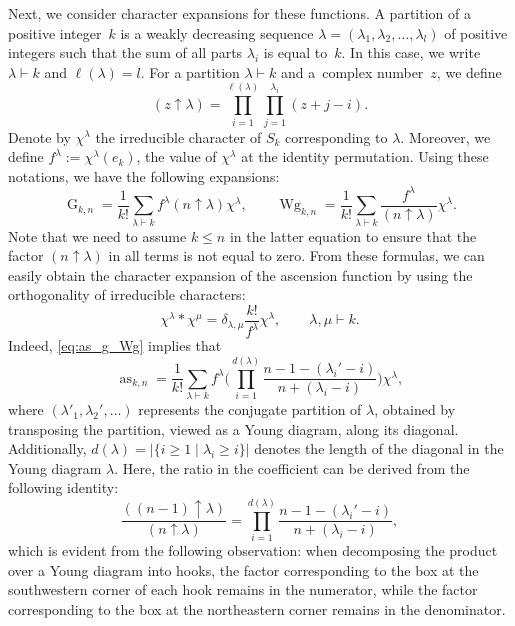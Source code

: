 \documentclass[10pt,a4paper]{amsart}
\numberwithin{equation}{section}
\theoremstyle{definition}
\DeclareMathOperator{\Raise}{as}
\DeclareMathOperator{\G}{G}
\DeclareMathOperator{\Wg}{Wg}
\begin{document}
Next, we consider character expansions for these functions.
A partition of a positive integer~$k$ is a weakly decreasing sequence
$\lambda=(\lambda_1,\lambda_2,\dots,\lambda_l)$ of positive integers
such that the sum of all parts $\lambda_i$ is equal to~$k$.
In this case, we write $\lambda \vdash k$
and $\ell(\lambda)=l$.
For a partition $\lambda \vdash k$ and a~complex number~$z$, we define
\[
(z\uparrow \lambda)= \prod_{i=1}^{\ell(\lambda)} \prod_{j=1}^{\lambda_i} (z+j-i).
\]
Denote by $\chi^\lambda$ the irreducible character of $S_k$ corresponding to $\lambda$.
Moreover, we define $f^\lambda :=\chi^\lambda(e_k)$,
the value of $\chi^\lambda$ at the identity permutation.
Using these notations, we have the following expansions:
\begin{equation} \label{eq:Wg_char}
 \G_{k,n} = \frac{1}{k!} \sum_{\lambda \vdash k} f^\lambda (n \uparrow \lambda) \chi^\lambda,
\qquad
\Wg_{k,n} = \frac{1}{k!} \sum_{\lambda \vdash k} \frac{f^\lambda}{(n \uparrow \lambda)} \chi^\lambda.
\end{equation}
Note that we need to assume $k \le n$ in the latter equation
to ensure that the factor $(n \uparrow \lambda)$ in all terms is not equal to zero.
From these formulas, we can easily obtain the character expansion of the ascension function by using the orthogonality of irreducible characters:
\[
\chi^\lambda * \chi^\mu = \delta_{\lambda,\mu} \frac{k!}{f^\lambda} \chi^\lambda, \qquad \lambda,\mu \vdash k.
\]
Indeed, \eqref{eq:as_g_Wg} implies that
\begin{equation*} %
 \Raise_{k,n} = \frac{1}{k!} \sum_{\lambda \vdash k} f^\lambda
 \Biggl( \prod_{i=1}^{d(\lambda)} \frac{n-1-(\lambda_i'-i)}{ n+(\lambda_i-i)} \Biggr) \chi^\lambda,
\end{equation*}
where $(\lambda'_1,\lambda_2',\dots)$ represents the conjugate partition of $\lambda$,
obtained by transposing the partition, viewed as a Young diagram, along its diagonal.
Additionally, $d(\lambda)=|\{i \ge 1 \mid \lambda_i \ge i\}|$ denotes the length of the diagonal in the Young diagram $\lambda$.
Here, the ratio in the coefficient can be derived from the following identity:
\[
\frac{((n-1) \uparrow \lambda)}{(n \uparrow \lambda)} =
\prod_{i=1}^{d(\lambda)} \frac{n-1-(\lambda_i'-i)}{ n+(\lambda_i-i)},
\]
which is evident from the following observation: when decomposing the product over a Young diagram into hooks, the factor corresponding to the box at the southwestern corner of each hook remains in the numerator, while the factor corresponding to the box at the northeastern corner remains in the denominator.
\end{document}
